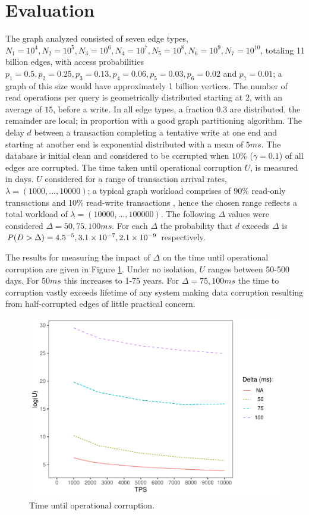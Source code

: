 \section{Evaluation}
\label{sec:evaluation}

The graph analyzed consisted of seven edge types, $N_1=10^4, N_2=10^5, N_3=10^6, N_4=10^7,  N_5=10^8, N_6=10^9, N_7=10^{10}$, totaling 11 billion edges, with access probabilities $p_1 =0.5, p_2 =0.25, p_3=0.13, p_4=0.06, p_5=0.03, p_6=0.02$ and $p_7 =0.01$; a graph of this size would have approximately 1 billion vertices.
The number of read operations per query is geometrically distributed starting at $2$, with an average of $15$, before a write.
In all edge types, a fraction $0.3$ are distributed, the remainder are local; in proportion with a good graph partitioning algorithm.
The delay $d$ between a transaction completing a tentative write at one end and starting at another end is exponential distributed with a mean of $5ms$.
The database is initial clean and considered to be corrupted when $10$\% ($\gamma = 0.1$) of all edges are corrupted.
The time taken until operational corruption $U$, is measured in days.
$U$ considered for a range of transaction arrival rates, $\lambda = (1000, ..., 10000)$; a typical graph workload comprises of 90\% read-only transactions and 10\% read-write transactions \cite{Angles2020}, hence the chosen range reflects a total workload of $\lambda = (10000, ..., 100000)$.
The following $\Delta$ values were considered $\Delta = 50, 75, 100ms$.
For each $\Delta$ the probability that $d$ exceeds $\Delta$ is $P(D > \Delta) = 4.5 \time 10^{-5}, 3.1 \times 10^{-7}, 2.1 \times 10^{-9}$ respectively.

The results for measuring the impact of $\Delta$ on the time until operational corruption are given in Figure \ref{time-to-corruption-results}.
Under no isolation, $U$ ranges between 50-500 days.
For $50ms$ this increases to 1-75 years. For $\Delta = 75, 100ms$ the time to corruption vastly exceeds lifetime of any system making data corruption resulting from half-corrupted edges of little practical concern.

\begin{figure}[h]
  \centering
  \includegraphics[width=\linewidth]{./figures/delta}
  \caption{Time until operational corruption.}
  \label{time-to-corruption-results}
\end{figure}

